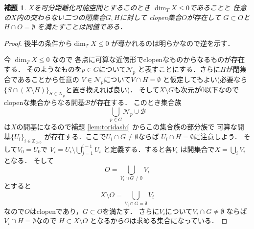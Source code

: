 \documentclass[leqno, a4paper, 12pt]{jsarticle}
\newtheorem{lem}[thm]{補題}
\newcommand{\zz}{\mathbb{Z}}
\begin{document}
\begin{lem}\label{lem:ultranormal}
$X$を可分距離化可能空間とするこのとき
$\dim_{T}X\le 0$であることと
任意の$X$内の交わらない二つの閉集合$G, H$に対して
clopen集合$O$が存在して
$G\subset O$と$H\cap O=\emptyset$
を満たすことは同値である．
\end{lem}
\begin{proof}
後半の条件から$\dim_{T} X\le 0$
が導かれるのは明らかなので逆を示す．

今
$\dim_{T}X\le 0$
なので
各点に可算な近傍形でclopenなものからなるものが存在する．
そのようなものを$p\in G$について$\mathcal{N}_{p}$
と表すことにする．さらに$H$が閉集合であることから任意の
$V\in \mathcal{N}_{p}$について$V\cap H=\emptyset$
と仮定してもよい(必要なら$\{S\cap (X\setminus H)\}_{S\in \mathcal{N}_{p}}$と置き換えれば良い)．
そして$X\setminus G$も次元が$0$以下なので
clopenな集合からなる開基$\mathcal{B}$が存在する．
このとき集合族
\[
\bigcup_{p\in G}\mathcal{N}_{p}\cup \mathcal{B}
\]
は$X$の開基になるので補題 \ref{lem:toridashi}
からこの集合族の部分族で
可算な開基$\{U_{i}\}_{i\in \zz_{\ge 0}}$
が存在する．ここで$U_{i}\cap G\neq \emptyset$ならば
$U_{i}\cap H=\emptyset$に注意しよう．
そして$V_{0}=U_{0}$で
$V_{i}=U_{i}\setminus \bigcup_{j=1}^{i-1}U_{i}$
と定義する．すると各$V_{i}$
は開集合で$X=\bigcup_{i}V_{i}$となる．
そして
\[
O=\bigcup_{V_{i}\cap G\neq \emptyset}V_{i}
\]
とすると
\[
X\setminus O=\bigcup_{V_{i}\cap G= \emptyset}V_{i}
\]
なので$O$はclopenであり，$G\subset O$を満たす．
さらに$V_{i}$について$V_{i}\cap G\neq \emptyset$
ならば$V_{i}\cap H=\emptyset$なので
$H\subset X\setminus O$
となるから$O$は求める集合になっている．
\end{proof}
\end{document}
